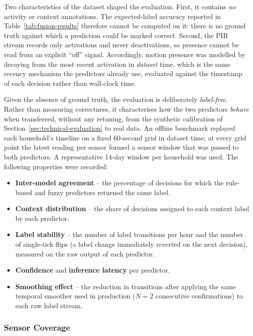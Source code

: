 Two characteristics of the dataset shaped the evaluation. First, it contains
\emph{no} activity or context annotations. The expected-label accuracy reported
in Table~\ref{tab:fusion-results} therefore cannot be computed on it: there is no
ground truth against which a prediction could be marked correct. Second, the PIR
stream records only activations and never deactivations, so presence cannot be
read from an explicit ``off'' signal. Accordingly, motion presence was modelled
by decaying from the most recent activation in \emph{dataset} time, which is the
same recency mechanism the predictors already use, evaluated against the
timestamp of each decision rather than wall-clock time.

Given the absence of ground truth, the evaluation is deliberately
\emph{label-free}. Rather than measuring correctness, it characterises how the
two predictors \emph{behave} when transferred, without any retuning, from the
synthetic calibration of Section~\ref{sec:technical-evaluation} to real data. An
offline benchmark replayed each household's timeline on a fixed 60-second grid in
dataset time; at every grid point the latest reading per sensor formed a sensor
window that was passed to both predictors. A representative 14-day window per
household was used. The following properties were recorded:

\begin{itemize}
    \item \textbf{Inter-model agreement} -- the percentage of decisions for which
    the rule-based and fuzzy predictors returned the same label.
    \item \textbf{Context distribution} -- the share of decisions assigned to each
    context label by each predictor.
    \item \textbf{Label stability} -- the number of label transitions per hour and
    the number of single-tick flips (a label change immediately reverted on the
    next decision), measured on the raw output of each predictor.
    \item \textbf{Confidence} and \textbf{inference latency} per predictor.
    \item \textbf{Smoothing effect} -- the reduction in transitions after applying
    the same temporal smoother used in production ($N = 2$ consecutive
    confirmations) to each raw label stream.
\end{itemize}

\subsubsection{Sensor Coverage}

